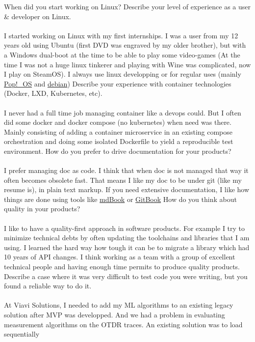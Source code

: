 \documentclass{exam}
\begin{document}
\begin{questions}
\question When did you start working on Linux? Describe your level of experience as a user \& developer on Linux.
\\~\\
I started working on Linux with my first internships. I was a user from my 12 years old 
using Ubuntu (first DVD was engraved by my older brother), but with a Windows dual-boot at the time to be able to play some video-games 
(At the time I was not a huge linux tinkerer and playing with Wine was complicated, now I play on SteamOS).
I always use linux developping or for regular uses (mainly \href{https://pop.system76.com/}{Pop!\_OS} and \href{https://www.debian.org/index.fr.html}{debian})
\question Describe your experience with container technologies (Docker, LXD, Kubernetes, etc).
\\~\\
I never had a full time job managing container like a devops could. But I often did some docker and docker compose (no kubernetes) when need was there.
Mainly consisting of adding a container microservice in an existing compose orchestration and doing some isolated Dockerfile to yield a reproducible test environment.
\question How do you prefer to drive documentation for your products?
\\~\\
I prefer managing doc as code. I think that when doc is not managed that way it often becomes obsolete fast. 
That means I like my doc to be under git (like my resume is), in plain text markup. 
If you need extensive documentation, I like how things are done using tools like \href{https://github.com/rust-lang/mdBook}{mdBook} or \href{https://www.gitbook.com/}{GitBook}
\question How do you think about quality in your products?
\\~\\
I like to have a quality-first approach in software products. 
For example I try to minimize technical debts by often updating the toolchains and libraries that I am using. I learned the hard way how tough it can be to migrate a library which had 10 years of API changes.
I think working as a team with a group of excellent technical people and having enough time permits to produce quality products.
\question Describe a case where it was very difficult to test code you were writing, but you found a reliable way to do it.
\\~\\
At Viavi Solutions, I needed to add my ML algorithms to an existing legacy solution after MVP was developped.
And we had a problem in evaluating measurement algorithms on the OTDR traces. An existing solution was to load sequentially 

\end{questions}
\end{document}
